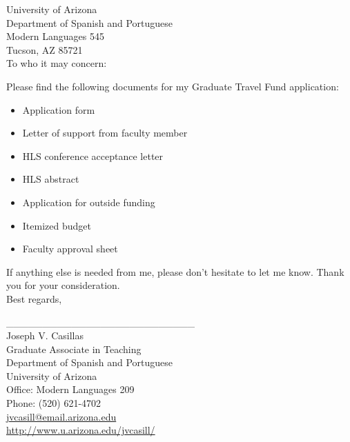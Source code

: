 \documentclass[12pt]{article}
\begin{document}
\phantom{hola}
\vspace{.05in}


\noindent University of Arizona \\
Department of Spanish and Portuguese \\
Modern Languages 545 \\
Tucson, AZ 85721\\

\noindent To who it may concern:\\

\vspace{.15in}


\noindent	Please find the following documents for my Graduate Travel Fund application:
	\begin{itemize}
		\item Application form 
		\item Letter of support from faculty member
		\item HLS conference acceptance letter 
		\item HLS abstract 
		\item Application for outside funding 
		\item Itemized budget 
		\item Faculty approval sheet 
	\end{itemize}

\noindent	If anything else is needed from me, please don't hesitate to let me know. Thank you for your consideration.\\


\noindent Best regards, \\

\vspace{1in}

\noindent \_\_\_\_\_\_\_\_\_\_\_\_\_\_\_\_\_\_\_\_\_\_\_\_\_\_ \\
\noindent Joseph V. Casillas \\ 
Graduate Associate in Teaching \\
Department of Spanish and Portuguese \\
University of Arizona \\
Office: Modern Languages 209 \\
Phone: (520) 621-4702 \\
\href{mailto:jvcasill@email.arizona.edu}{jvcasill@email.arizona.edu} \\
\href{http://www.u.arizona.edu/~jvcasill/}{http://www.u.arizona.edu/\hspace{-.7mm}\texttildelow jvcasill/}\\

	
\end{document}
